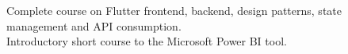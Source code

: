 \documentclass[
    10pt,
    english,
]{article}
\begin{document}
{}
{Complete course on Flutter frontend, backend, design patterns, state management and API consumption.}
\\
{Introductory short course to the Microsoft Power BI tool.}
\end{document}
